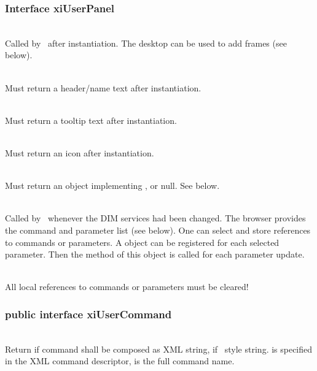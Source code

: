 \subsubsection{Interface xiUserPanel}
\bcir
\item {}\\
Called by \gui~after instantiation. The desktop can be used to add frames (see below).\\
\item {}\\
Must return a header/name text after instantiation.\\
\item {}\\
Must return a tooltip text after instantiation.\\
\item {}\\
Must return an icon after instantiation.\\
\item {}\\
Must return an object implementing , or null. See below.\\
\item {}\\
Called by \gui~whenever the DIM services had been changed.
The browser provides the command and parameter list (see below). 
One can select and store references to commands or parameters. 
A  object can be registered for each selected parameter. 
Then the  method of this object is called for each parameter update.\\
\item {}\\
All local references to commands or parameters must be cleared!
\ecir
\subsubsection{public interface xiUserCommand}
\bcir
\item {}\\
Return  if command shall be composed as XML string, 
 if \mbs~style string.  
is specified in the XML command descriptor,  is the full command name.
\ecir

